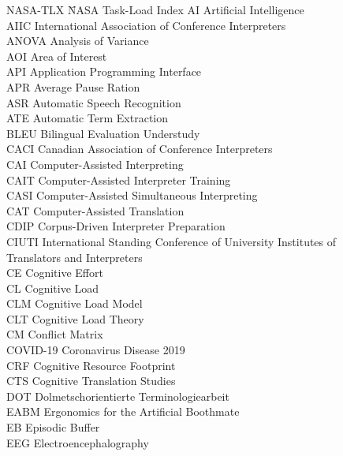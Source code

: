 \addchap{\lsAbbreviationsTitle}
\begin{tabbing}
{NASA-TLX}  \=  NASA Task-Load Index\kill
{AI} \>  Artificial Intelligence\\
{AIIC} \>  International Association of Conference Interpreters\\
{ANOVA} \>  Analysis of Variance\\
{AOI} \>  Area of Interest\\
{API} \>  Application Programming Interface\\
{APR}  \>  Average Pause Ration\\
{ASR}  \>  Automatic Speech Recognition\\
{ATE}  \>  Automatic Term Extraction\\
{BLEU}  \>  Bilingual Evaluation Understudy\\
{CACI}  \>  Canadian Association of Conference Interpreters\\
{CAI}  \>  Computer-Assisted Interpreting\\
{CAIT}  \>  Computer-Assisted Interpreter Training\\
{CASI}  \>  Computer-Assisted Simultaneous Interpreting\\
{CAT}  \>  Computer-Assisted Translation\\
{CDIP}  \>  Corpus-Driven Interpreter Preparation\\
{CIUTI}  \>  International Standing Conference of University Institutes of \\ \> Translators and Interpreters\\
{CE}  \>  Cognitive Effort\\
{CL}  \>  Cognitive Load\\
{CLM}  \>  Cognitive Load Model\\
{CLT}  \>  Cognitive Load Theory\\
{CM}  \>  Conflict Matrix\\
{COVID-19}  \>  Coronavirus Disease 2019\\
{CRF}  \>  Cognitive Resource Footprint\\
{CTS}  \>  Cognitive Translation Studies\\
{DOT}  \>  Dolmetschorientierte Terminologiearbeit\\
{EABM}  \>  Ergonomics for the Artificial Boothmate\\
{EB}  \>  Episodic Buffer\\
{EEG}  \>  Electroencephalography\\

\end{tabbing}
